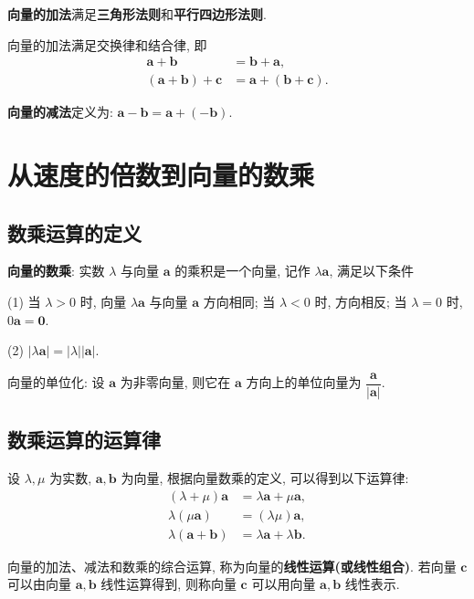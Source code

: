 \documentclass[titlepage]{ctexart}
\begin{document}
\textbf{向量的加法}满足\textbf{三角形法则}和\textbf{平行四边形法则}.

向量的加法满足交换律和结合律, 即
\begin{align*}
    \boldsymbol{a} + \boldsymbol{b} &= \boldsymbol{b} + \boldsymbol{a}, \\
    (\boldsymbol{a} + \boldsymbol{b}) + \boldsymbol{c} &= \boldsymbol{a} + (\boldsymbol{b} + \boldsymbol{c}).
\end{align*}

\textbf{向量的减法}定义为: $\boldsymbol{a} - \boldsymbol{b} = \boldsymbol{a} + (-\boldsymbol{b})$.


\section{从速度的倍数到向量的数乘}

\subsection{数乘运算的定义}

\textbf{向量的数乘}: 实数 $\lambda$ 与向量 $\boldsymbol{a}$ 的乘积是一个向量, 记作 $\lambda \boldsymbol{a}$, 满足以下条件

(1) 当 $\lambda > 0$ 时, 向量 $\lambda \boldsymbol{a}$ 与向量 $\boldsymbol{a}$ 方向相同; 当 $\lambda < 0$ 时, 方向相反; 
当 $\lambda = 0$ 时, $0\boldsymbol{a} = \boldsymbol{0}$.

(2) $|\lambda \boldsymbol{a}| = |\lambda||\boldsymbol{a}|$.

向量的单位化: 设 $\boldsymbol{a}$ 为非零向量, 则它在 $\boldsymbol{a}$ 方向上的单位向量为 $\dfrac{\boldsymbol{a}}{|\boldsymbol{a}|}$.

\subsection{数乘运算的运算律}

设 $\lambda, \mu$ 为实数, $\boldsymbol{a}, \boldsymbol{b}$ 为向量, 根据向量数乘的定义, 可以得到以下运算律:
\begin{align*}
    (\lambda + \mu)\boldsymbol{a} &= \lambda \boldsymbol{a} + \mu \boldsymbol{a}, \\
    \lambda (\mu \boldsymbol{a}) &= (\lambda \mu)\boldsymbol{a}, \\
    \lambda(\boldsymbol{a} + \boldsymbol{b}) &= \lambda \boldsymbol{a} + \lambda \boldsymbol{b}.
\end{align*}

向量的加法、减法和数乘的综合运算, 称为向量的\textbf{线性运算(或线性组合)}. 
若向量 $\boldsymbol{c}$ 可以由向量 $\boldsymbol{a}, \boldsymbol{b}$ 线性运算得到,
则称向量 $\boldsymbol{c}$ 可以用向量 $\boldsymbol{a}, \boldsymbol{b}$ 线性表示.
\end{document}
